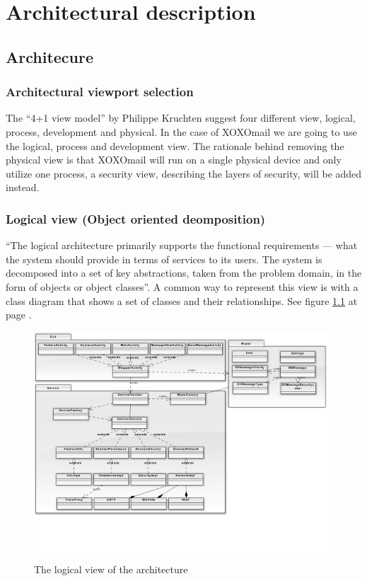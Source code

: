 \chapter{Architectural description}

\section{Architecure}

\subsection{Architectural viewport selection}
The “4+1 view model” by Philippe Kruchten suggest four different view, logical, process, development and physical. In the case of XOXOmail we are going to use the logical, process and development view. The rationale behind removing the physical view is that XOXOmail will run on a single physical device and only utilize one process, a security view, describing the layers of security, will be added instead.

\subsection{Logical view (Object oriented deomposition)}
“The logical architecture primarily supports the functional requirements --- what the system should provide in terms of services to its users. The system is decomposed into a set of key abstractions, taken from the problem domain, in the form of objects or object classes”. A common way to represent this view is with a class diagram that shows a set of classes and their relationships.
See figure \ref{fig:logicalview} at page \pageref{fig:logicalview}.

\begin{figure}
	\includegraphics[width=\textwidth]{logicalview.png}
	\caption{The logical view of the architecture}
	\label{fig:logicalview}
\end{figure}


